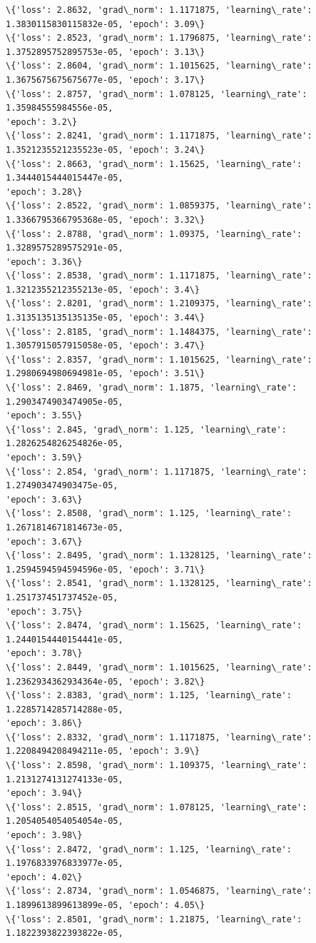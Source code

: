 \documentclass[11pt]{article}
\begin{document}
\begin{Verbatim}[commandchars=\\\{\}]
\{'loss': 2.8632, 'grad\_norm': 1.1171875, 'learning\_rate':
1.3830115830115832e-05, 'epoch': 3.09\}
\{'loss': 2.8523, 'grad\_norm': 1.1796875, 'learning\_rate':
1.3752895752895753e-05, 'epoch': 3.13\}
\{'loss': 2.8604, 'grad\_norm': 1.1015625, 'learning\_rate':
1.3675675675675677e-05, 'epoch': 3.17\}
\{'loss': 2.8757, 'grad\_norm': 1.078125, 'learning\_rate': 1.35984555984556e-05,
'epoch': 3.2\}
\{'loss': 2.8241, 'grad\_norm': 1.1171875, 'learning\_rate':
1.3521235521235523e-05, 'epoch': 3.24\}
\{'loss': 2.8663, 'grad\_norm': 1.15625, 'learning\_rate': 1.3444015444015447e-05,
'epoch': 3.28\}
\{'loss': 2.8522, 'grad\_norm': 1.0859375, 'learning\_rate':
1.3366795366795368e-05, 'epoch': 3.32\}
\{'loss': 2.8788, 'grad\_norm': 1.09375, 'learning\_rate': 1.3289575289575291e-05,
'epoch': 3.36\}
\{'loss': 2.8538, 'grad\_norm': 1.1171875, 'learning\_rate':
1.3212355212355213e-05, 'epoch': 3.4\}
\{'loss': 2.8201, 'grad\_norm': 1.2109375, 'learning\_rate':
1.3135135135135135e-05, 'epoch': 3.44\}
\{'loss': 2.8185, 'grad\_norm': 1.1484375, 'learning\_rate':
1.3057915057915058e-05, 'epoch': 3.47\}
\{'loss': 2.8357, 'grad\_norm': 1.1015625, 'learning\_rate':
1.2980694980694981e-05, 'epoch': 3.51\}
\{'loss': 2.8469, 'grad\_norm': 1.1875, 'learning\_rate': 1.2903474903474905e-05,
'epoch': 3.55\}
\{'loss': 2.845, 'grad\_norm': 1.125, 'learning\_rate': 1.2826254826254826e-05,
'epoch': 3.59\}
\{'loss': 2.854, 'grad\_norm': 1.1171875, 'learning\_rate': 1.274903474903475e-05,
'epoch': 3.63\}
\{'loss': 2.8508, 'grad\_norm': 1.125, 'learning\_rate': 1.2671814671814673e-05,
'epoch': 3.67\}
\{'loss': 2.8495, 'grad\_norm': 1.1328125, 'learning\_rate':
1.2594594594594596e-05, 'epoch': 3.71\}
\{'loss': 2.8541, 'grad\_norm': 1.1328125, 'learning\_rate': 1.251737451737452e-05,
'epoch': 3.75\}
\{'loss': 2.8474, 'grad\_norm': 1.15625, 'learning\_rate': 1.2440154440154441e-05,
'epoch': 3.78\}
\{'loss': 2.8449, 'grad\_norm': 1.1015625, 'learning\_rate':
1.2362934362934364e-05, 'epoch': 3.82\}
\{'loss': 2.8383, 'grad\_norm': 1.125, 'learning\_rate': 1.2285714285714288e-05,
'epoch': 3.86\}
\{'loss': 2.8332, 'grad\_norm': 1.1171875, 'learning\_rate':
1.2208494208494211e-05, 'epoch': 3.9\}
\{'loss': 2.8598, 'grad\_norm': 1.109375, 'learning\_rate': 1.2131274131274133e-05,
'epoch': 3.94\}
\{'loss': 2.8515, 'grad\_norm': 1.078125, 'learning\_rate': 1.2054054054054054e-05,
'epoch': 3.98\}
\{'loss': 2.8472, 'grad\_norm': 1.125, 'learning\_rate': 1.1976833976833977e-05,
'epoch': 4.02\}
\{'loss': 2.8734, 'grad\_norm': 1.0546875, 'learning\_rate':
1.1899613899613899e-05, 'epoch': 4.05\}
\{'loss': 2.8501, 'grad\_norm': 1.21875, 'learning\_rate': 1.1822393822393822e-05,

\end{Verbatim}
\end{document}
